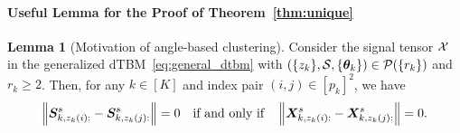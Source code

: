 \documentclass[lettersize,onecolumn,journal]{IEEEtran}
\theoremstyle{definition}
\newtheorem{lem}{Lemma}
\theoremstyle{definition}
\begin{document}
\paragraph{Useful Lemma for the Proof of Theorem~\ref{thm:unique}} 

\begin{lem}[Motivation of angle-based clustering]\label{lem:angle} Consider the signal tensor $\mathcal{X}$ in the generalized dTBM~\eqref{eq:general_dtbm} with $(\{z_k\},\mathcal{S},\{\boldsymbol{\theta}_k\})\in \mathcal{P}(\{r_k\})$ and $r_k \geq 2$. Then, for any $k \in [K]$ and index pair $(i,j)\in[p_k]^2$, we have 
\begin{equation}
    \left\lVert \bm S_{k,z_k(i):}^s -  \bm S_{k,z_k(j):}^s \right\rVert = 0 \quad \text{if and only if} \quad \left\lVert  \bm X_{k, z_k(i):}^s -  \bm X_{k,z_k(j):}^s \right\rVert = 0.
\end{equation}
\end{lem}
\end{document}
